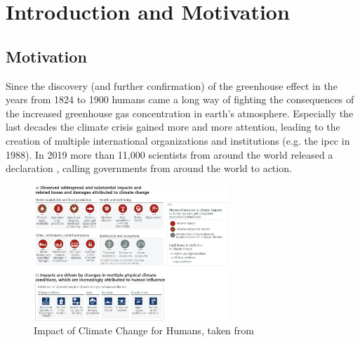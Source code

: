 \chapter{Introduction and Motivation}
\label{ch:intro}


\section{Motivation}
\label{sec:motivation}


Since the discovery (and further confirmation) of the greenhouse effect in the years from 1824 to 1900 \cite{fourier1824remarques, foote1856circumstances} humans came a long way of fighting the consequences of the increased greenhouse gas concentration in earth's atmosphere. 
Especially the last decades the climate crisis gained more and more attention, leading to the creation of multiple international organizations and institutions (e.g. the \ac{ipcc} in 1988). 
In 2019 more than 11,000  scientists from around the world released a declaration \cite{ripple_world_2019}, calling governments from around the world to action.




\begin{figure}[hbt]
  \begin{center}
    \includegraphics[width=0.65\textwidth]{figures/ipcc_6th_report_impacts_climate_change.png}
  \end{center}
  \caption{Impact of Climate Change for Humans, taken from \cite{lee2024climate}}
  \label{fig:impacts_climate_change}
\end{figure}



